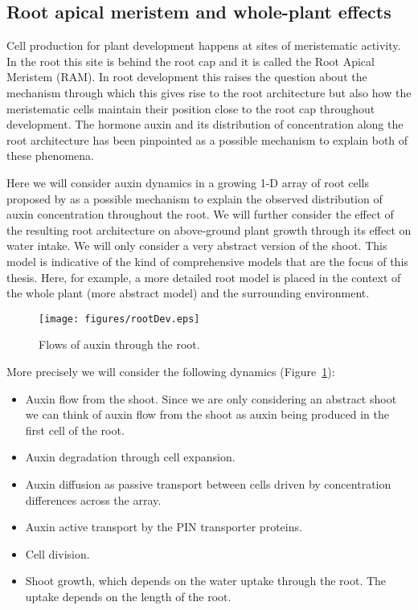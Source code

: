 \subsection{Root apical meristem and whole-plant effects}
\label{subsec:rootDev}
Cell production for plant development happens at sites of meristematic
activity. In the root this site is behind the root cap and it is called the Root
Apical Meristem (RAM). In root development this raises the question about the
mechanism through which this gives rise to the root architecture but also how
the meristematic cells maintain their position close to the root cap throughout
development. The hormone auxin and its distribution of concentration along the
root architecture has been pinpointed as a possible mechanism to explain both of
these phenomena.

Here we will consider auxin dynamics in a growing 1-D array of root cells
proposed by \citet{mironova_plausible_2010} as a possible mechanism to explain
the observed distribution of auxin concentration throughout the root. We will
further consider the effect of the resulting root architecture on above-ground
plant growth through its effect on water intake. We will only consider a very
abstract version of the shoot. This model is indicative of the kind of
comprehensive models that are the focus of this thesis. Here, for example, a
more detailed root model is placed in the context of the whole plant (more
abstract model) and the surrounding environment.

\begin{figure}
\centering
\texttt{[image: figures/rootDev.eps]}
\caption{Flows of auxin through the root.}
\label{fig:rootDev}
\end{figure}

More precisely we will consider the following dynamics
(Figure~\ref{fig:rootDev}):
\begin{itemize}
\item Auxin flow from the shoot. Since we are only considering an abstract shoot
  we can think of auxin flow from the shoot as auxin being produced in the first
  cell of the root.
\item Auxin degradation through cell expansion.
\item Auxin diffusion as passive transport between cells driven by concentration
  differences across the array.
\item Auxin active transport by the PIN transporter proteins.
\item Cell division.
\item Shoot growth, which depends on the water uptake through the root. The
  uptake depends on the length of the root.
\end{itemize}


